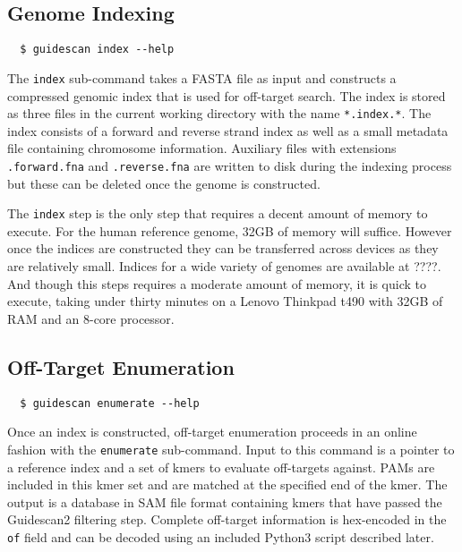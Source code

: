 \documentclass[11pt]{article}
\begin{document}
\subsection{Genome Indexing}

\begin{verbatim}
  $ guidescan index --help
\end{verbatim}

The \texttt{index} sub-command takes a FASTA file as input and
constructs a compressed genomic index that is used for off-target
search. The index is stored as three files in the current working
directory with the name \texttt{*.index.*}. The index
consists of a forward and reverse strand index as well as a small
metadata file containing chromosome information. Auxiliary files with
extensions \texttt{.forward.fna} and \texttt{.reverse.fna} are written
to disk during the indexing process but these can be deleted once the
genome is constructed.

The \texttt{index} step is the only step that requires a decent amount
of memory to execute. For the human reference genome, 32GB of memory
will suffice. However once the indices are constructed they can be
transferred across devices as they are relatively small. Indices for a
wide variety of genomes are available at ????. And though this steps
requires a moderate amount of memory, it is quick to execute, taking
under thirty minutes on a Lenovo Thinkpad t490 with 32GB of RAM and an
8-core processor.

\subsection{Off-Target Enumeration}
\begin{verbatim}
  $ guidescan enumerate --help
\end{verbatim}

Once an index is constructed, off-target enumeration proceeds in an
online fashion with the \texttt{enumerate} sub-command. Input to this
command is a pointer to a reference index and a set of kmers to
evaluate off-targets against. PAMs are included in this kmer set and
are matched at the specified end of the kmer. The output is a database
in SAM file format containing kmers that have passed the Guidescan2
filtering step. Complete off-target information is hex-encoded in the
\texttt{of} field and can be decoded using an included Python3 script
described later.
\end{document}
